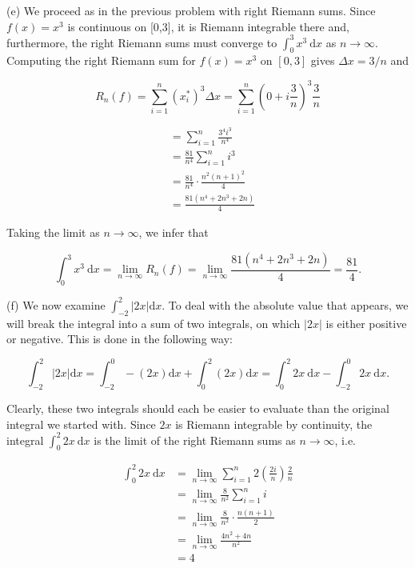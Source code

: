 \documentclass[10pt]{article}
\begin{document}
(e) We proceed as in the previous problem with right Riemann sums. Since $f(x)=x^{3}$ is continuous on [0,3], it is Riemann integrable there and, furthermore, the right Riemann sums must converge to $\int_{0}^{3} x^{3} \mathrm{~d} x$ as $n \rightarrow \infty$. Computing the right Riemann sum for $f(x)=x^{3}$ on $[0,3]$ gives $\Delta x=3 / n$ and

$$
R_{n}(f)=\sum_{i=1}^{n}\left(x_{i}^{*}\right)^{3} \Delta x=\sum_{i=1}^{n}\left(0+i \frac{3}{n}\right)^{3} \frac{3}{n}
$$

$$
\begin{aligned}
& =\sum_{i=1}^{n} \frac{3^{4} i^{3}}{n^{4}} \\
& =\frac{81}{n^{4}} \sum_{i=1}^{n} i^{3} \\
& =\frac{81}{n^{4}} \cdot \frac{n^{2}(n+1)^{2}}{4} \\
& =\frac{81\left(n^{4}+2 n^{3}+2 n\right)}{4}
\end{aligned}
$$

Taking the limit as $n \rightarrow \infty$, we infer that

$$
\int_{0}^{3} x^{3} \mathrm{~d} x=\lim _{n \rightarrow \infty} R_{n}(f)=\lim _{n \rightarrow \infty} \frac{81\left(n^{4}+2 n^{3}+2 n\right)}{4}=\frac{81}{4} .
$$

(f) We now examine $\int_{-2}^{2}|2 x| \mathrm{d} x$. To deal with the absolute value that appears, we will break the integral into a sum of two integrals, on which $|2 x|$ is either positive or negative. This is done in the following way:

$$
\int_{-2}^{2}|2 x| \mathrm{d} x=\int_{-2}^{0}-(2 x) \mathrm{d} x+\int_{0}^{2}(2 x) \mathrm{d} x=\int_{0}^{2} 2 x \mathrm{~d} x-\int_{-2}^{0} 2 x \mathrm{~d} x .
$$

Clearly, these two integrals should each be easier to evaluate than the original integral we started with. Since $2 x$ is Riemann integrable by continuity, the integral $\int_{0}^{2} 2 x \mathrm{~d} x$ is the limit of the right Riemann sums as $n \rightarrow \infty$, i.e.

$$
\begin{aligned}
\int_{0}^{2} 2 x \mathrm{~d} x & =\lim _{n \rightarrow \infty} \sum_{i=1}^{n} 2\left(\frac{2 i}{n}\right) \frac{2}{n} \\
& =\lim _{n \rightarrow \infty} \frac{8}{n^{2}} \sum_{i=1}^{n} i \\
& =\lim _{n \rightarrow \infty} \frac{8}{n^{2}} \cdot \frac{n(n+1)}{2} \\
& =\lim _{n \rightarrow \infty} \frac{4 n^{2}+4 n}{n^{2}} \\
& =4
\end{aligned}
$$
\end{document}
